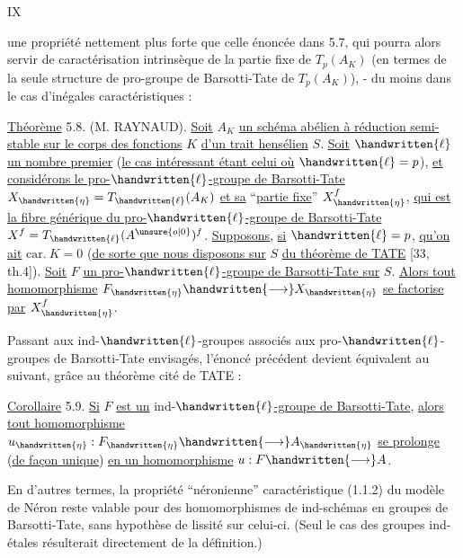 \hfill IX

une propriété nettement plus forte que celle énoncée dans 5.7, qui pourra alors servir de caractérisation intrinsèque de la partie fixe de $T_p(A_K)$ (en termes de la seule structure de pro-groupe de Barsotti-Tate de $T_p(A_K)$), - du moins dans le cas d'inégales caractéristiques :

\uline{Théorème} 5.8. (M. RAYNAUD). \uline{Soit} $A_K$ \uline{un schéma abélien à réduction semi-stable sur le corps des fonctions} $K$ \uline{d'un trait hensélien} $S$. \uline{Soit} $\handwritten{\ell}$ \uline{un nombre premier} (\uline{le cas intéressant étant celui où} $\handwritten{\ell}=p$), \uline{et considérons le pro-}$\handwritten{\ell}$\uline{-groupe de Barsotti-Tate} $X_{\handwritten{\eta}}=T_{\handwritten{\ell}}(A_K)$ \uline{et sa} ``\uline{partie fixe}'' $X_{\handwritten{\eta}}^f$, \uline{qui est la fibre générique du pro-}$\handwritten{\ell}$\uline{-groupe de Barsotti-Tate} $X^f=T_{\handwritten{\ell}}(A^{\unsure{o|0}})^f$. \uline{Supposons}, \uline{si} $\handwritten{\ell}=p$, \uline{qu'on ait} $\mathrm{car.}\ K=0$ (\uline{de sorte que nous disposons sur} $S$ \uline{du théorème de TATE} [33, th.4]). \uline{Soit} $F$ \uline{un pro-}$\handwritten{\ell}$\uline{-groupe de Barsotti-Tate sur} $S$. \uline{Alors tout homomorphisme} $F_{\handwritten{\eta}}\handwritten{\longrightarrow}X_{\handwritten{\eta}}$ \uline{se factorise par} $X_{\handwritten{\eta}}^f$.

Passant aux ind-$\handwritten{\ell}$-groupes associés aux pro-$\handwritten{\ell}$-groupes de Barsotti-Tate envisagés, l'énoncé précédent devient équivalent au suivant, grâce au théorème cité de TATE :

\uline{Corollaire} 5.9. \uline{Si} $F$ \uline{est un} ind-$\handwritten{\ell}$\uline{-groupe de Barsotti-Tate}, \uline{alors tout homomorphisme} $u_{\handwritten{\eta}}: F_{\handwritten{\eta}}\handwritten{\longrightarrow} A_{\handwritten{\eta}}$ \uline{se prolonge} (\uline{de façon unique}) \uline{en un homomorphisme} $u: F\handwritten{\longrightarrow} A$.

En d'autres termes, la propriété ``néronienne'' caractéristique (1.1.2) du modèle de Néron reste valable pour des homomorphismes de ind-schémas en groupes de Barsotti-Tate, sans hypothèse de lissité sur celui-ci. (Seul le cas des groupes ind-étales résulterait directement de la définition.)

